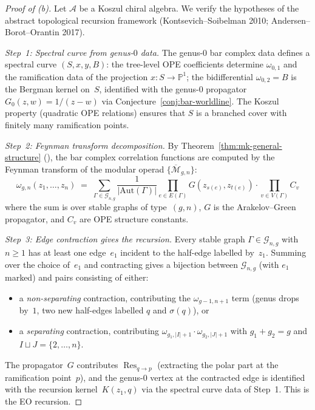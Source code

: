 \begin{proof}[Proof of \textup{(b)}]
Let $\mathcal{A}$ be a Koszul chiral algebra.  We verify the hypotheses
of the abstract topological recursion framework
(Kontsevich--Soibelman 2010; Andersen--Borot--Orantin 2017).

\emph{Step~1: Spectral curve from genus-$0$ data.}
The genus-$0$ bar complex data defines a spectral curve
$(S, x, y, B)$: the tree-level OPE coefficients determine
$\omega_{0,1}$ and the ramification data of the projection
$x\colon S \to \mathbb{P}^1$; the bidifferential
$\omega_{0,2} = B$ is the Bergman kernel on~$S$, identified with
the genus-$0$ propagator $G_0(z,w) = 1/(z-w)$ via
Conjecture~\ref{conj:bar-worldline}.  The Koszul property (quadratic
OPE relations) ensures that $S$ is a branched cover with finitely
many ramification points.

\emph{Step~2: Feynman transform decomposition.}
By Theorem~\ref{thm:mk-general-structure} (\ClaimStatusProvedHere),
the bar complex correlation functions are computed by the Feynman
transform of the modular operad $\{\overline{\mathcal{M}}_{g,n}\}$:
\[
\omega_{g,n}(z_1, \ldots, z_n) \;=\; \sum_{\Gamma \in \mathcal{G}_{n,g}}
\frac{1}{|\mathrm{Aut}(\Gamma)|}
\prod_{e \in E(\Gamma)} G(z_{s(e)}, z_{t(e)})
\cdot \prod_{v \in V(\Gamma)} C_v
\]
where the sum is over stable graphs of type~$(g,n)$,
$G$ is the Arakelov--Green propagator, and $C_v$ are OPE structure
constants.

\emph{Step~3: Edge contraction gives the recursion.}
Every stable graph $\Gamma \in \mathcal{G}_{n,g}$ with $n \geq 1$
has at least one edge~$e_1$ incident to the half-edge labelled by~$z_1$.
Summing over the choice of~$e_1$ and contracting gives a bijection
between $\mathcal{G}_{n,g}$ (with $e_1$ marked) and pairs consisting
of either:
\begin{itemize}
\item a \emph{non-separating} contraction, contributing the
      $\omega_{g-1,n+1}$ term (genus drops by~$1$, two new
      half-edges labelled $q$ and $\sigma(q)$), or
\item a \emph{separating} contraction, contributing
      $\omega_{g_1,|I|+1} \cdot \omega_{g_2,|J|+1}$ with
      $g_1+g_2 = g$ and $I \sqcup J = \{2,\ldots,n\}$.
\end{itemize}
The propagator~$G$ contributes $\operatorname{Res}_{q \to p}$
(extracting the polar part at the ramification point~$p$), and
the genus-$0$ vertex at the contracted edge is identified with the
recursion kernel~$K(z_1, q)$ via the spectral curve data of Step~1.
This is the EO recursion.


\end{proof}
